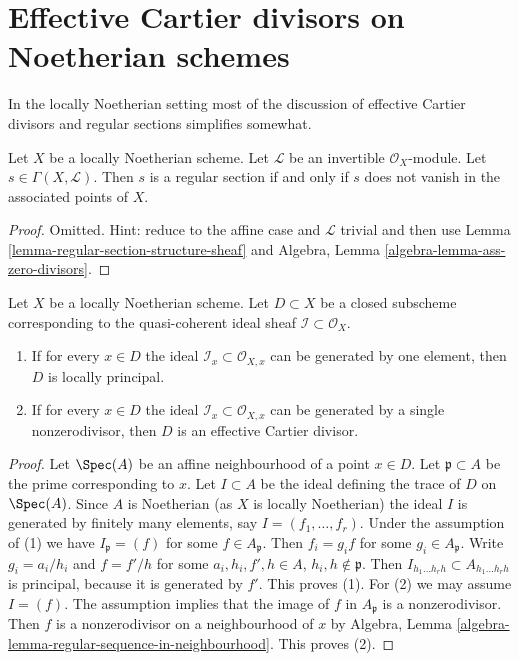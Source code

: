 \section{Effective Cartier divisors on Noetherian schemes}
\label{section-Noetherian-effective-Cartier}

\noindent
In the locally Noetherian setting most of the discussion of
effective Cartier divisors and regular sections simplifies somewhat.

\begin{lemma}
\label{lemma-regular-section-associated-points}
Let $X$ be a locally Noetherian scheme. Let $\mathcal{L}$ be an invertible
$\mathcal{O}_X$-module. Let $s \in \Gamma(X, \mathcal{L})$. Then $s$
is a regular section if and only if $s$ does not vanish in the associated
points of $X$.
\end{lemma}

\begin{proof}
Omitted. Hint: reduce to the affine case and $\mathcal{L}$ trivial
and then use Lemma \ref{lemma-regular-section-structure-sheaf} and
Algebra, Lemma \ref{algebra-lemma-ass-zero-divisors}.
\end{proof}

\begin{lemma}
\label{lemma-effective-Cartier-in-points}
Let $X$ be a locally Noetherian scheme. Let $D \subset X$ be a closed subscheme
corresponding to the quasi-coherent ideal sheaf
$\mathcal{I} \subset \mathcal{O}_X$.
\begin{enumerate}
\item If for every $x \in D$ the ideal
$\mathcal{I}_x \subset \mathcal{O}_{X, x}$
can be generated by one element, then $D$ is locally principal.
\item If for every $x \in D$ the ideal
$\mathcal{I}_x \subset \mathcal{O}_{X, x}$
can be generated by a single nonzerodivisor, then $D$ is an
effective Cartier divisor.
\end{enumerate}
\end{lemma}

\begin{proof}
Let $\Spec(A)$ be an affine neighbourhood of a point $x \in D$.
Let $\mathfrak p \subset A$ be the prime corresponding to $x$.
Let $I \subset A$ be the ideal defining the trace of $D$ on
$\Spec(A)$. Since $A$ is Noetherian (as $X$ is locally Noetherian)
the ideal $I$ is generated by finitely many elements, say
$I = (f_1, \ldots, f_r)$. Under the assumption of (1) we have
$I_\mathfrak p = (f)$ for some $f \in A_\mathfrak p$.
Then $f_i = g_i f$ for some $g_i \in A_\mathfrak p$.
Write $g_i = a_i/h_i$ and $f = f'/h$ for some
$a_i, h_i, f', h \in A$, $h_i, h \not \in \mathfrak p$.
Then $I_{h_1 \ldots h_r h} \subset A_{h_1 \ldots h_r h}$ is
principal, because it is generated by $f'$. This proves (1).
For (2) we may assume $I = (f)$. The assumption implies
that the image of $f$ in $A_\mathfrak p$ is a nonzerodivisor.
Then $f$ is a nonzerodivisor on a neighbourhood of $x$ by
Algebra, Lemma \ref{algebra-lemma-regular-sequence-in-neighbourhood}.
This proves (2).
\end{proof}

